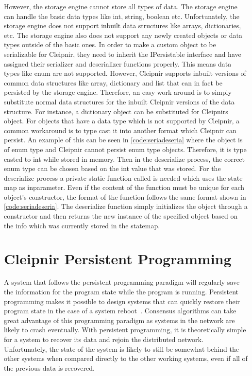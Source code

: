 However, the storage engine cannot store all types of data. The storage engine can handle the basic data types like int, string, boolean etc. Unfortunately, the storage engine does not support inbuilt data structures like arrays, dictionaries, etc. The storage engine also does not support any newly created objects or data types outside of the basic ones. In order to make a custom object to be serializable for Cleipnir, they need to inherit the IPersistable interface and have assigned their serializer and deserializer functions properly. This means data types like enum are not supported. However, Cleipnir supports inbuilt versions of common data structures like array, dictionary and list that can in fact be persisted by the storage engine. Therefore, an easy work around is to simply substitute normal data structures for the inbuilt Cleipnir versions of the data structure. For instance, a dictionary object can be substituted for Cleipnirs  object. For objects that have a data type which is not supported by Cleipnir, a common workaround is to type cast it into another format which Cleipnir can persist. An example of this can be seen in \autoref{code:seriadeseria} where the object  is of enum type and Cleipnir cannot persist enum type objects. Therefore, it is type casted to int while stored in memory. Then in the deserialize process, the correct enum type can be chosen based on the int value that was stored. For the deserialize process a private static function called  is needed which uses the state map as inparameter. Even if the content of the function must be unique for each object’s constructor, the format of the function follows the same format shown in \autoref{code:seriadeseria}. The deserialize function simply initializes the object through a constructor and then returns the new instance of the specified object based on the info which was currently stored in the statemap.
\fi

\section{Cleipnir Persistent Programming}
\label{section:PersistentProgramming}

A system that follows the persistent programming paradigm will regularly save the information for the program state while the program is running. Persistent programming makes it possible to design systems that can quickly restore their program state in the case of a system reboot~\cites{DOC:Cleipnir}[p.~6]{PAPER:PaxosCleipnir}. Consensus algorithms can take great advantage of this programming paradigm as systems in the network are likely to crash eventually. With persistent programming, it is theoretically simple for a system to recover its data and rejoin the distributed network. Unfortunately, the state of the system is likely to still be somewhat behind the other systems when compared directly to the other working systems, even if all of the previous data is recovered. 

